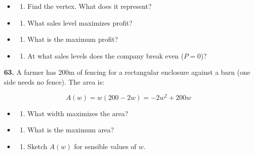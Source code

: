 \documentclass[
  11pt,
]{article}
\providecommand{\tightlist}{%
  \setlength{\itemsep}{0pt}\setlength{\parskip}{0pt}}
\begin{document}
\begin{itemize}
\item
  \begin{enumerate}
  \def\labelenumi{(\alph{enumi})}
  \tightlist
  \item
    Find the vertex. What does it represent?
  \end{enumerate}
\item
  \begin{enumerate}
  \def\labelenumi{(\alph{enumi})}
  \setcounter{enumi}{1}
  \tightlist
  \item
    What sales level maximizes profit?
  \end{enumerate}
\item
  \begin{enumerate}
  \def\labelenumi{(\alph{enumi})}
  \setcounter{enumi}{2}
  \tightlist
  \item
    What is the maximum profit?
  \end{enumerate}
\item
  \begin{enumerate}
  \def\labelenumi{(\alph{enumi})}
  \setcounter{enumi}{3}
  \tightlist
  \item
    At what sales levels does the company break even (\(P = 0\))?
  \end{enumerate}
\end{itemize}

\textbf{63.} A farmer has 200m of fencing for a rectangular enclosure
against a barn (one side needs no fence). The area is:

\[A(w) = w(200 - 2w) = -2w^2 + 200w\]

\begin{itemize}
\item
  \begin{enumerate}
  \def\labelenumi{(\alph{enumi})}
  \tightlist
  \item
    What width maximizes the area?
  \end{enumerate}
\item
  \begin{enumerate}
  \def\labelenumi{(\alph{enumi})}
  \setcounter{enumi}{1}
  \tightlist
  \item
    What is the maximum area?
  \end{enumerate}
\item
  \begin{enumerate}
  \def\labelenumi{(\alph{enumi})}
  \setcounter{enumi}{2}
  \tightlist
  \item
    Sketch \(A(w)\) for sensible values of \(w\).
  \end{enumerate}
\end{itemize}
\end{document}
